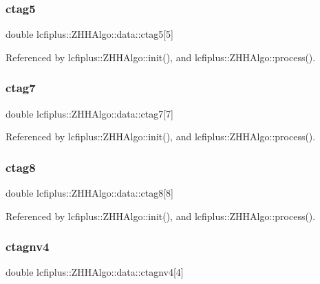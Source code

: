 \subsubsection{ctag5}
{\footnotesize\ttfamily double lcfiplus\+::\+Z\+H\+H\+Algo\+::data\+::ctag5[5]}



Referenced by lcfiplus\+::\+Z\+H\+H\+Algo\+::init(), and lcfiplus\+::\+Z\+H\+H\+Algo\+::process().

\mbox{\label{structlcfiplus_1_1ZHHAlgo_1_1data_aa1aaef6221aa9a28b98286504288f81e}} 
\subsubsection{ctag7}
{\footnotesize\ttfamily double lcfiplus\+::\+Z\+H\+H\+Algo\+::data\+::ctag7[7]}



Referenced by lcfiplus\+::\+Z\+H\+H\+Algo\+::init(), and lcfiplus\+::\+Z\+H\+H\+Algo\+::process().

\mbox{\label{structlcfiplus_1_1ZHHAlgo_1_1data_a0e27b32f568241dcfb2c69f33a88100c}} 
\subsubsection{ctag8}
{\footnotesize\ttfamily double lcfiplus\+::\+Z\+H\+H\+Algo\+::data\+::ctag8[8]}



Referenced by lcfiplus\+::\+Z\+H\+H\+Algo\+::init(), and lcfiplus\+::\+Z\+H\+H\+Algo\+::process().

\mbox{\label{structlcfiplus_1_1ZHHAlgo_1_1data_a04547134bf3c7f9101f0ee9c089582b5}} 
\subsubsection{ctagnv4}
{\footnotesize\ttfamily double lcfiplus\+::\+Z\+H\+H\+Algo\+::data\+::ctagnv4[4]}



